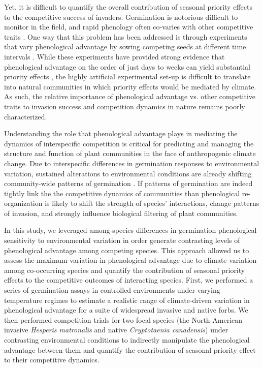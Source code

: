 \documentclass{article}\usepackage[]{graphicx}\usepackage[]{color}
\begin{document}
Yet, it is difficult to quantify the overall contribution of seasonal priority effects to the competitive success of invaders. Germination is notorious difficult to monitor in the field, and rapid phenology often co-varies with other competitive traits \citep{Dickson2012,Milbau:2003vt,HAO:2009vh}. %
One way that this problem has been addressed is through experiments that vary phenological advantage by sowing competing seeds at different time intervals \citep{Young:2017aa}. While these experiments have provided strong evidence that phenological advantage on the order of just days to weeks can yield substantial priority effects \citep{Weidlich:2020aa}, the highly artificial experimental set-up is difficult to translate into natural communities in which priority effects would be mediated by climate. As such, the relative importance of phenological advantage vs. other competitive traits to invasion success and competition dynamics in nature remains poorly characterized. %

Understanding the role that phenological advantage plays in mediating the dynamics of interspecific competition is critical for predicting and managing the structure and function of plant communities in the face of anthropogenic climate change. Due  to interspecific differences in germination responses to environmental variation, sustained alterations to environmental conditions are already shifting community-wide patterns of germination \citep{Walck2011}. If patterns of germination are indeed tightly link the the competitive dynamics of communities than phenological re-organization is likely to shift the strength of species' interactions, change patterns of invasion, and strongly influence biological filtering of plant communities. 

In this study, we leveraged among-species differences in germination phenological sensitivity to environmental variation in order generate contrasting levels of phenological advantage among competing species. This approach allowed us to assess the maximum variation in phenological advantage due to climate variation among co-occurring species and quantify the contribution of seasonal priority effects to the competitive outcomes of interacting species. First, we performed a series of germination assays in controlled environments under varying temperature regimes to estimate a realistic range of climate-driven variation in phenological advantage for a suite of widespread invasive and native forbs.  We then performed competition trials for two focal species (the North American invasive \textit{Hesperis matronalis} and native \textit{Cryptotaenia canadensis}) under contrasting environmental conditions to indirectly manipulate the phenological advantage between them and quantify the contribution of seasonal priority effect to their competitive dynamics.
\end{document}
